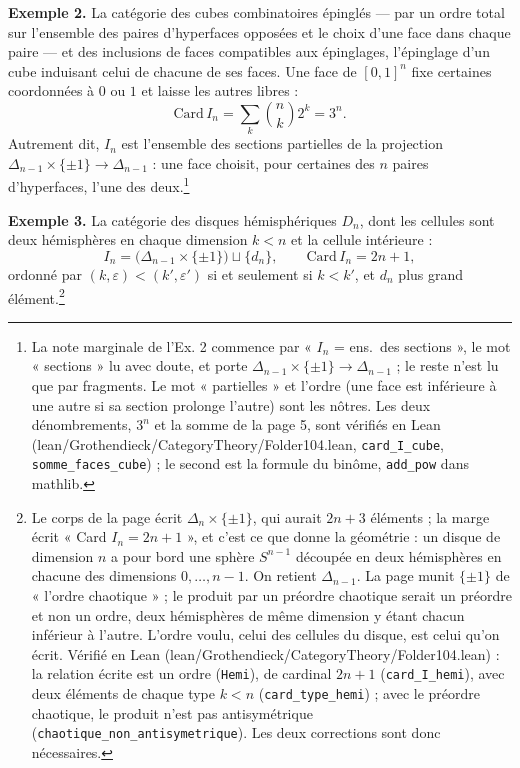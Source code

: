 \documentclass[11pt,a4paper]{article}
\begin{document}
\textbf{Exemple 2.} La catégorie des cubes combinatoires épinglés --- par un
ordre total sur l'ensemble des paires d'hyperfaces opposées et le choix d'une
face dans chaque paire --- et des inclusions de faces compatibles aux
épinglages, l'épinglage d'un cube induisant celui de chacune de ses faces.
Une face de $[0,1]^{n}$ fixe certaines coordonnées à $0$ ou $1$ et laisse les
autres libres :
\[
\mathrm{Card}\, I_{n} = \sum_{k} \binom{n}{k} 2^{k} = 3^{n}.
\]
Autrement dit, $I_{n}$ est l'ensemble des sections partielles de la projection
$\Delta_{n-1} \times \{\pm 1\} \to \Delta_{n-1}$ : une face choisit, pour
certaines des $n$ paires d'hyperfaces, l'une des deux.\footnote{La note
marginale de l'Ex. 2 commence par « $I_{n}$ = ens.\ des sections », le mot
« sections » lu avec doute, et porte $\Delta_{n-1} \times \{\pm 1\} \to
\Delta_{n-1}$ ; le reste n'est lu que par fragments. Le mot « partielles » et
l'ordre (une face est inférieure à une autre si sa section prolonge
l'autre) sont les nôtres. Les deux dénombrements, $3^{n}$ et la somme de la
page 5, sont vérifiés en Lean (lean/Grothendieck/CategoryTheory/Folder104.lean,
\texttt{card\_I\_cube}, \texttt{somme\_faces\_cube}) ; le second est la formule
du binôme, \texttt{add\_pow} dans mathlib.}

\textbf{Exemple 3.} La catégorie des disques hémisphériques $D_{n}$, dont les
cellules sont deux hémisphères en chaque dimension $k < n$ et la cellule
intérieure :
\[
I_{n} = \bigl(\Delta_{n-1} \times \{\pm 1\}\bigr) \sqcup \{d_{n}\},
\qquad \mathrm{Card}\, I_{n} = 2n + 1,
\]
ordonné par $(k, \varepsilon) < (k', \varepsilon')$ si et seulement si
$k < k'$, et $d_{n}$ plus grand élément.\footnote{Le corps de la page écrit
$\Delta_{n} \times \{\pm 1\}$, qui aurait $2n + 3$ éléments ; la marge écrit
« Card $I_{n} = 2n+1$ », et c'est ce que donne la géométrie : un disque de
dimension $n$ a pour bord une sphère $S^{n-1}$ découpée en deux hémisphères en
chacune des dimensions $0, \ldots, n-1$. On retient $\Delta_{n-1}$. La page
munit $\{\pm 1\}$ de « l'ordre chaotique » ; le produit par un préordre
chaotique serait un préordre et non un ordre, deux hémisphères de même
dimension y étant chacun inférieur à l'autre. L'ordre voulu, celui des cellules
du disque, est celui qu'on écrit. Vérifié en Lean
(lean/Grothendieck/CategoryTheory/Folder104.lean) : la relation écrite est un ordre
(\texttt{Hemi}), de cardinal $2n + 1$ (\texttt{card\_I\_hemi}), avec deux
éléments de chaque type $k < n$ (\texttt{card\_type\_hemi}) ; avec le
préordre chaotique, le produit n'est pas antisymétrique
(\texttt{chaotique\_non\_antisymetrique}). Les deux corrections sont donc
nécessaires.}
\end{document}
